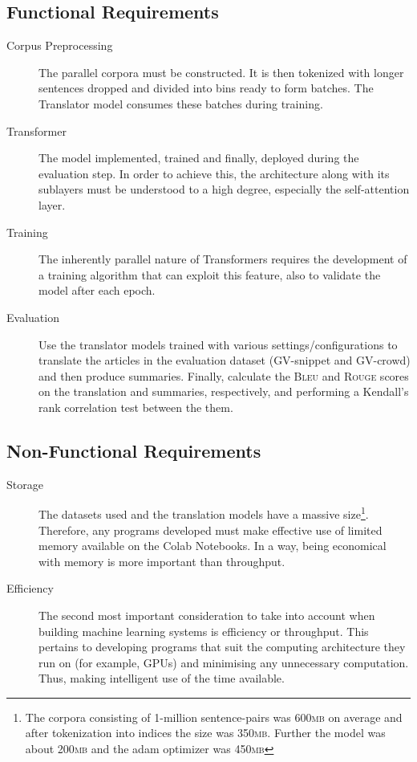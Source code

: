 \documentclass[12pt,a4paper,twoside,openright]{report}
\newcommand{\bleu}{\textsc{Bleu} }
\newcommand{\rouge}{\textsc{Rouge} }
\begin{document}
\subsection{Functional Requirements}
\label{functional-requirements}

\begin{description}
\item[Corpus Preprocessing] The parallel corpora must be constructed. It is then tokenized with longer sentences dropped and divided into bins ready to form batches. The Translator model consumes these batches during training.

\item[Transformer] The model implemented, trained and finally, deployed during the evaluation step. In order to achieve this, the architecture along with its sublayers must be understood to a high degree, especially the self-attention layer.

\item[Training] The inherently parallel nature of Transformers requires the development of a training algorithm that can exploit this feature, also to validate the model after each epoch.

\item[Evaluation] Use the translator models trained with various settings/configurations  to translate the articles in the evaluation dataset (GV-snippet and GV-crowd) and then produce summaries. Finally, calculate the \bleu and \rouge scores on the translation and summaries, respectively, and performing a Kendall's rank correlation test between the them.
\end{description}

\subsection{Non-Functional Requirements}
\label{non-functional-requirements}

\begin{description}
\item[Storage]
The datasets used and the translation models have a massive size\footnote{The corpora consisting of 1-million sentence-pairs was 600\textsc{mb} on average and after tokenization into indices the size was 350\textsc{mb}. Further the model was about 200\textsc{mb} and the adam optimizer was 450\textsc{mb}}. Therefore, any programs developed must make effective use of limited memory available on the Colab Notebooks. In a way, being economical with memory is more important than throughput.

\item[Efficiency]
The second most important consideration to take into account when building machine learning systems is efficiency or throughput. This pertains to developing programs that suit the computing architecture they run on (for example, GPUs) and minimising any unnecessary computation. Thus, making intelligent use of the time available.
\end{description}
\end{document}
